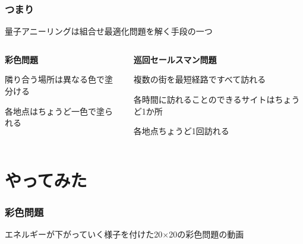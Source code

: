 \begin{frame}
  \frametitle{つまり}

  {\Large   量子アニーリングは組合せ最適化問題を解く手段の一つ}
  \vspace{5mm}

  \begin{columns}
    \begin{column}{0.45\textwidth}
      \textbf{彩色問題}
      \begin{itemize}
          \item 隣り合う場所は異なる色で塗分ける
          {\pause \item {\color{important_font}各地点はちょうど一色で塗られる}}
      \end{itemize}
    \end{column}

    \begin{column}{0.45\textwidth}
      \textbf{巡回セールスマン問題}
      \begin{itemize}
          \item 複数の街を最短経路ですべて訪れる
          {\pause \item {\color{important_font}各時間に訪れることのできるサイトはちょうど1か所}}
          {\pause \item {\color{important_font}各地点ちょうど1回訪れる}}
      \end{itemize}
    \end{column}
  \end{columns}
  \vspace{5mm}
\end{frame}

\section{やってみた}
\begin{frame}
  \frametitle{彩色問題}
  エネルギーが下がっていく様子を付けた20×20の彩色問題の動画
\end{frame}

